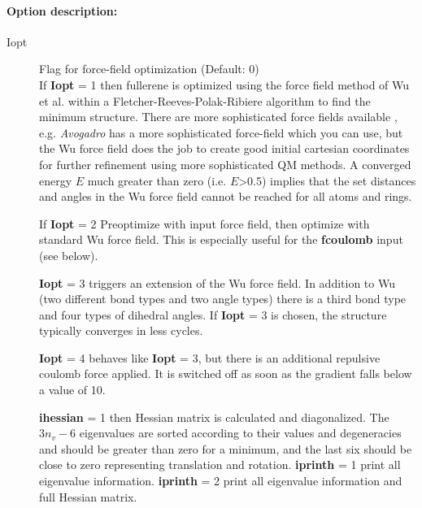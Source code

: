 \documentclass[article,a4paper,twoside]{memoir}
\newcommand{\paramname}[1]{{\color{green}\textbf{#1}}}
\begin{document}
\paragraph{Option description:}
\begin{description}
\item[{Iopt}]  Flag for force-field optimization (Default: 0)\\
  If \paramname{Iopt} = 1  then fullerene is optimized using the force field method of Wu et al. \cite{Wu87} within a 
  Fletcher-Reeves-Polak-Ribiere algorithm to find the minimum structure. 
  There are more sophisticated force fields available \cite{Ceulemans,Hands04},
  e.g. \textit{Avogadro} has a more sophisticated force-field which you can use, but the Wu force field does the 
  job to create good initial cartesian coordinates for further refinement using more sophisticated QM methods. 
  A converged energy $E$ much greater than zero (i.e. $E$>0.5) implies that the set distances and angles in the Wu force field cannot be
  reached for all atoms and rings.

  If \paramname{Iopt} = 2  Preoptimize with input force field, then optimize with standard Wu force field. This is especially useful for the \paramname{fcoulomb} input (see below).

  \paramname{Iopt} = 3 triggers an extension of the Wu force field.  In addition to Wu (two different bond types
  and two angle types) there is a third bond type and four types of dihedral angles.  If \paramname{Iopt} = 3 is
  chosen, the structure typically converges in less cycles.

  \paramname{Iopt} = 4 behaves like \paramname{Iopt} = 3, but there is an additional repulsive coulomb force applied.  It is switched off
  as soon as the gradient falls below a value of 10.
  
   \paramname{ihessian} = 1 then Hessian matrix is calculated and diagonalized. The $3n_v-6$ eigenvalues are sorted according to their values
   and degeneracies and should be greater than zero for a minimum, and the last six should be close to zero representing translation and rotation.
   \paramname{iprinth}  = 1 print all eigenvalue information.   
   \paramname{iprinth}  = 2 print all eigenvalue information and full Hessian matrix.
   

\end{description}
\end{document}
